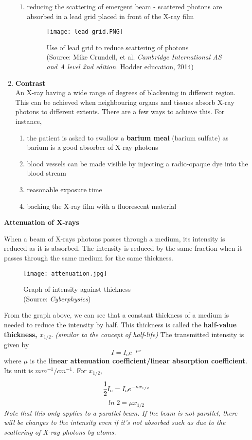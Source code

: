 \documentclass{article}
\begin{document}
\begin{enumerate}
\begin{enumerate}
        \item reducing the scattering of emergent beam - scattered photons are absorbed in a lead grid placed in front of the X-ray film
        \begin{figure}[H]
            \centering
            \captionsetup{justification=centering,margin=2cm}
            \texttt{[image: lead grid.PNG]}
            \caption*{Use of lead grid to reduce scattering of photons \\ (Source: Mike Crundell, et al. \textit{Cambridge International AS and A level 2nd edition.} Hodder education, 2014)}
        \end{figure}
    \end{enumerate} 
    \item \textbf{Contrast}
    \\An X-ray having a wide range of degrees of blackening in different region. This can be achieved when neighbouring organs and tissues absorb X-ray photons to different extents. There are a few ways to achieve this. For instance, 
        \begin{enumerate}
            \item the patient is asked to swallow a \textbf{barium meal} (barium sulfate) as barium is a good absorber of X-ray photons
            \item blood vessels can be made visible by injecting a radio-opaque dye into the blood stream
            \item reasonable exposure time
            \item backing the X-ray film with a fluorescent material
        \end{enumerate}
\end{enumerate}

\begin{flushleft}
\textbf{Attenuation of X-rays}
\end{flushleft}
When a beam of X-rays photons passes through a medium, its intensity is reduced as it is absorbed. The intensity is reduced by the same fraction when it passes through the same medium for the same thickness. 
\begin{figure}[H]
    \centering
    \captionsetup{justification=centering,margin=2cm}
    \texttt{[image: attenuation.jpg]}
    \caption*{Graph of intensity against thickness \\ (Source: \textit{Cyberphysics})}
\end{figure}
From the graph above, we can see that a constant thickness of a medium is needed to reduce the intensity by half. This thickness is called the \textbf{half-value thickness, $x_{1/2}$}. \textit{(similar to the concept of half-life)} 
The transmitted intensity is given by
$$I=I_oe^{-\mu x}$$
where $\mu$ is the \textbf{linear attenuation coefficient/linear absorption coefficient}. Its unit is $mm^{-1}/cm^{-1}$.
For $x_{1/2}$, 
$$\cfrac{1}{2}I_o=I_oe^{-\mu x_{1/2}}$$
$$ln\;2=\mu x_{1/2}$$
\textit{Note that this only applies to a parallel beam. If the beam is not parallel, there will be changes to the intensity even if it's not absorbed such as due to the scattering of X-ray photons by atoms.}
\end{document}
